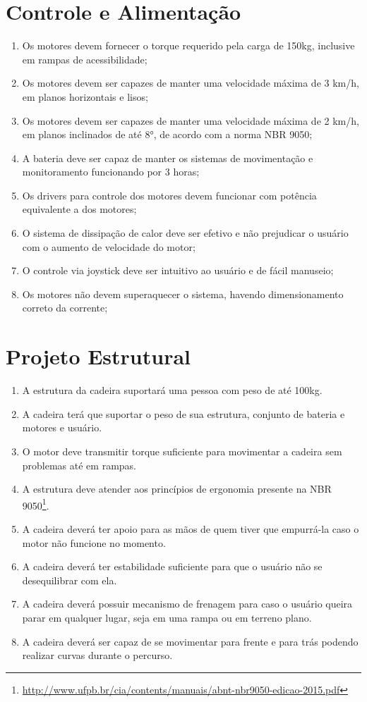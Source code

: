 \section{Controle e Alimentação}
\begin{enumerate}[resume*]
\item Os motores devem fornecer o torque requerido pela carga de 150kg, inclusive em rampas de acessibilidade;
\item Os motores devem ser capazes de manter uma velocidade máxima de 3 km/h, em planos horizontais e lisos;
\item Os motores devem ser capazes de manter uma velocidade máxima de 2 km/h, em planos inclinados de até 8°, de acordo com a norma NBR 9050;
\item A bateria deve ser capaz de manter os sistemas de movimentação e monitoramento funcionando por 3 horas;
\item Os drivers para controle dos motores devem funcionar com potência equivalente a dos motores;
\item O sistema de dissipação de calor deve ser efetivo e não prejudicar o usuário com o aumento de velocidade do motor;
\item O controle via joystick deve ser intuitivo ao usuário e de fácil manuseio;
\item Os motores não devem superaquecer o sistema, havendo dimensionamento correto da corrente;
\end{enumerate}

\section{Projeto Estrutural}

\begin{enumerate}[resume*]
  \item A estrutura da cadeira suportará uma pessoa com peso de até 100kg.
  \item A cadeira terá que suportar o peso de sua estrutura, conjunto de bateria
    e motores e usuário.
  \item O motor deve transmitir torque suficiente para movimentar a cadeira sem
    problemas até em rampas.
  \item A estrutura deve atender aos princípios de ergonomia presente na NBR
    9050\footnote{\url{http://www.ufpb.br/cia/contents/manuais/abnt-nbr9050-edicao-2015.pdf}}.
  \item A cadeira deverá ter apoio para as mãos de quem tiver que empurrá-la
    caso o motor não funcione no momento.
  \item A cadeira deverá ter estabilidade suficiente para que o usuário não se
    desequilibrar com ela.
  \item A cadeira deverá possuir mecanismo de frenagem para caso o usuário
    queira parar em qualquer lugar, seja em uma rampa ou em terreno plano.
  \item A cadeira deverá ser capaz de se movimentar para frente e para trás
    podendo realizar curvas durante o percurso.
\end{enumerate}
